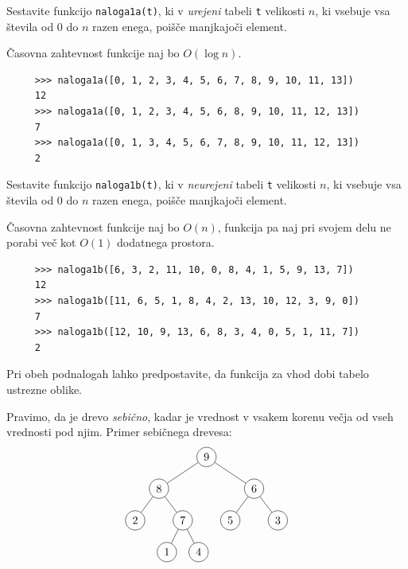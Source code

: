 \documentclass[arhiv]{izpit}
\begin{document}

\naloga[25 točk]

\podnaloga
  Sestavite funkcijo \verb|naloga1a(t)|,
    ki v \emph{urejeni} tabeli \verb|t| velikosti $n$,
    ki vsebuje vsa števila od $0$ do $n$ razen enega,
    poišče manjkajoči element.

  Časovna zahtevnost funkcije naj bo $O(\log n)$.

  {\small\begin{verbatim}
     >>> naloga1a([0, 1, 2, 3, 4, 5, 6, 7, 8, 9, 10, 11, 13])
     12
     >>> naloga1a([0, 1, 2, 3, 4, 5, 6, 8, 9, 10, 11, 12, 13])
     7
     >>> naloga1a([0, 1, 3, 4, 5, 6, 7, 8, 9, 10, 11, 12, 13])
     2\end{verbatim}}

\podnaloga
  Sestavite funkcijo \verb|naloga1b(t)|,
    ki v \emph{neurejeni} tabeli \verb|t| velikosti $n$,
    ki vsebuje vsa števila od $0$ do $n$ razen enega,
    poišče manjkajoči element.

  Časovna zahtevnost funkcije naj bo $O(n)$,
    funkcija pa naj pri svojem delu ne porabi več kot $O(1)$ dodatnega prostora.

  {\small\begin{verbatim}
     >>> naloga1b([6, 3, 2, 11, 10, 0, 8, 4, 1, 5, 9, 13, 7])
     12
     >>> naloga1b([11, 6, 5, 1, 8, 4, 2, 13, 10, 12, 3, 9, 0])
     7
     >>> naloga1b([12, 10, 9, 13, 6, 8, 3, 4, 0, 5, 1, 11, 7])
     2\end{verbatim}}

\medskip
\noindent
  Pri obeh podnalogah lahko predpostavite,
  da funkcija za vhod dobi tabelo ustrezne oblike.



\naloga[25 točk]

Pravimo, da je drevo \emph{sebično},
  kadar je vrednost v vsakem korenu večja od vseh vrednosti pod njim.
Primer sebičnega drevesa:
\[
  \begin{tikzpicture}[level distance=1cm,
    level 1/.style={sibling distance=3cm},
    level 2/.style={sibling distance=1.5cm},
    level 3/.style={sibling distance=1cm}
    ]
    \node[circle, draw] {9}
      child {node[circle, draw] {8}
        child {node[circle, draw] {2}}
        child {node[circle, draw] {7}
          child {node[circle, draw] {1}}
          child {node[circle, draw] {4}}
        }
      }
      child {node[circle, draw] {6}
        child {node[circle, draw] {5}}
        child {node[circle, draw] {3}}
      };
  \end{tikzpicture}
\]
\end{document}
